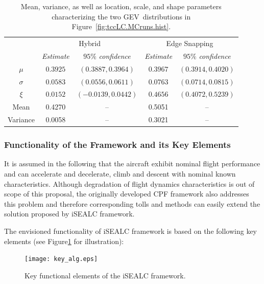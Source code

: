 \documentclass[letter,onecolumn,12pt]{aiaa-tc}
\newcommand{\1}{1_n}
\begin{document}

\begin{table}[t]
    \centering
    \caption[Characterization of the GEV~distributions in Fig.~\ref{fig:tccLC.MCruns.hist}.]{Mean, variance, as well as location, scale, and shape parameters characterizing the two GEV~distributions in Figure~\ref{fig:tccLC.MCruns.hist}.}
    \label{tbl:tccLC.MCruns.GEVfit}
    \renewcommand{\arraystretch}{1.2}
    \begin{tabular}{c | c c | c c}
    \hline\hline
    \hspace{1cm} & \multicolumn{2}{c|}{Hybrid} & \multicolumn{2}{c}{Edge Snapping} \\
    & \emph{Estimate} & $95\%$ \emph{confidence} & \emph{Estimate} & $95\%$ \emph{confidence} \\
    \hline
    $\mu$ & $0.3925$ & $(0.3887,0.3964)$ & $0.3967$ & $( 0.3914,0.4020)$ \\
    $\sigma$  & $0.0583$ & $(0.0556,0.0611)$ & $0.0763$ & $(0.0714,0.0815)$ \\
    $\xi$  & $0.0152$ & $(-0.0139,0.0442)$ & $0.4656$ & $(0.4072,0.5239)$ \\
    \hline
    Mean     & 0.4270 & -- & 0.5051 & -- \\
    Variance & 0.0058 & -- & 0.3021 & -- \\
    \hline\hline
  	\end{tabular}
\end{table}


\subsubsection{Functionality of the Framework and its Key Elements}
\label{subsubsec:functionality}
It is assumed in the following that the aircraft exhibit nominal flight performance and can accelerate and decelerate, climb and descent with nominal known characteristics.  Although degradation of flight dynamics characteristics is out of scope of this proposal, the originally developed CPF framework also addresses this problem and therefore corresponding tolls and methods can easily extend the solution proposed by iSEALC framework.

The envisioned functionality of iSEALC framework is based on the following key elements (see Figure\ref{fig:KeyAlg} for illustration):
%
\begin{figure}[thpb]
\centering
\vspace{-0mm}
\texttt{[image: key\_alg.eps]}
\caption{Key functional elements of the iSEALC framework.}
\label{fig:KeyAlg}
\end{figure}
\vspace{-1mm}
\end{document}
